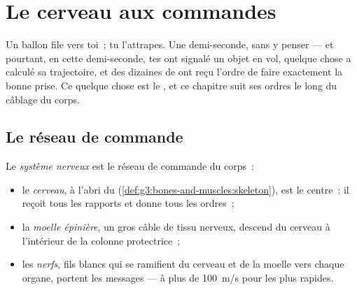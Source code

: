 \chapter{Le cerveau aux commandes}\label{ch:g5:brain-in-command}

Un ballon file vers toi~; tu l'attrapes. Une demi-seconde, sans y
penser --- et pourtant, en cette demi-seconde, tes  ont signalé
un objet en vol, quelque chose a calculé sa trajectoire, et des
dizaines de  ont reçu l'ordre de faire exactement la bonne
prise. Ce quelque chose est le , et ce chapitre suit ses
ordres le long du câblage du corps.

\section{Le réseau de commande}

\begin{definition}\label{def:g5:brain-in-command:system}
Le \emph{système nerveux} est le réseau de
commande du corps~:
\begin{itemize}
  \item le \emph{cerveau}, à l'abri du 
        (\cref{def:g3:bones-and-muscles:skeleton}), est le centre~:
        il reçoit tous les rapports et donne tous les ordres~;
  \item la \emph{moelle épinière}, un gros
        câble de tissu nerveux, descend du cerveau à l'intérieur de
        la colonne protectrice~;
  \item les \emph{nerfs}, fils blancs qui se ramifient
        du cerveau et de la moelle vers chaque organe, portent les
        messages --- à plus de \qty{100}{m/s} pour les plus rapides.
\end{itemize}
\end{definition}


